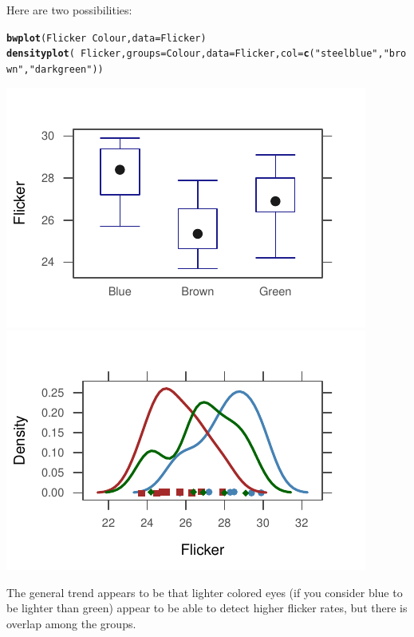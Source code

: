 \documentclass[twoside]{book}\usepackage[]{graphicx}\usepackage[]{xcolor}
\makeatletter
\def\maxwidth{ %
  \ifdim\Gin@nat@width>\linewidth
    \linewidth
  \else
    \Gin@nat@width
  \fi
}
\newcommand{\hlstr}[1]{\textcolor[rgb]{0.192,0.494,0.8}{#1}}%
\newcommand{\hlopt}[1]{\textcolor[rgb]{0,0,0}{#1}}%
\newcommand{\hlstd}[1]{\textcolor[rgb]{0.345,0.345,0.345}{#1}}%
\newcommand{\hlkwc}[1]{\textcolor[rgb]{0.333,0.667,0.333}{#1}}%
\newcommand{\hlkwd}[1]{\textcolor[rgb]{0.737,0.353,0.396}{\textbf{#1}}}%
\newenvironment{kframe}{%
 \def\at@end@of@kframe{}%
 \ifinner\ifhmode%
  \def\at@end@of@kframe{\end{minipage}}%
  \begin{minipage}{\columnwidth}%
 \fi\fi%
 \def\FrameCommand##1{\hskip\@totalleftmargin \hskip-\fboxsep
 \colorbox{shadecolor}{##1}\hskip-\fboxsep
     \hskip-\linewidth \hskip-\@totalleftmargin \hskip\columnwidth}%
 \MakeFramed {\advance\hsize-\width
   \@totalleftmargin\z@ \linewidth\hsize
   \@setminipage}}%
 {\par\unskip\endMakeFramed%
 \at@end@of@kframe}
\newenvironment{knitrout}{}{} %
\makeatother
\begin{document}
\begin{solution}
Here are two possibilities:
\begin{knitrout}
\color{fgcolor}\begin{kframe}
\begin{alltt}
\hlkwd{bwplot}\hlstd{(Flicker} \hlopt{~} \hlstd{Colour,} \hlkwc{data} \hlstd{= Flicker)}
\hlkwd{densityplot}\hlstd{(}\hlopt{~}\hlstd{Flicker,} \hlkwc{groups} \hlstd{= Colour,} \hlkwc{data} \hlstd{= Flicker,} \hlkwc{col} \hlstd{=} \hlkwd{c}\hlstd{(}\hlstr{"steelblue"}\hlstd{,} \hlstr{"brown"}\hlstd{,} \hlstr{"darkgreen"}\hlstd{))}
\end{alltt}
\end{kframe}

{\centering \includegraphics[width=\maxwidth]{figures/fig-unnamed-chunk-168-1} 
\includegraphics[width=\maxwidth]{figures/fig-unnamed-chunk-168-2} 

}



\end{knitrout}
The general trend appears to be that lighter colored eyes (if you consider blue
to be lighter than green) appear to be able to detect higher flicker rates, but
there is overlap among the groups.
\newpage
\end{solution}
\end{document}

